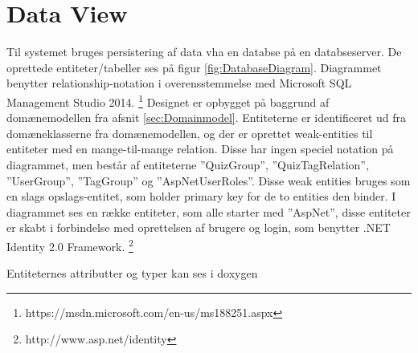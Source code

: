 \section{Data View}

Til systemet bruges persistering af data vha en databse på en databseserver. De oprettede entiteter/tabeller ses på figur \ref{fig:DatabaseDiagram}. Diagrammet benytter relationship-notation i overensstemmelse med Microsoft SQL Management Studio 2014. \footnote{https://msdn.microsoft.com/en-us/ms188251.aspx}
Designet er opbygget på baggrund af domænemodellen fra afsnit \ref{sec:Domainmodel}. Entiteterne er identificeret ud fra domæneklasserne fra domænemodellen, og der er oprettet weak-entities til entiteter med en mange-til-mange relation. Disse har ingen speciel notation på diagrammet, men består af entiteterne ''QuizGroup'', ''QuizTagRelation'', ''UserGroup'', ''TagGroup'' og ''AspNetUserRoles''. Disse weak entities bruges som en slags opslags-entitet, som holder primary key for de to entities den binder.
I diagrammet ses en række entiteter, som alle starter med ''AspNet'', disse entiteter er skabt i forbindelse med oprettelsen af brugere og login, som benytter .NET Identity 2.0 Framework. \footnote{http://www.asp.net/identity}


Entiteternes attributter og typer kan ses i doxygen 
